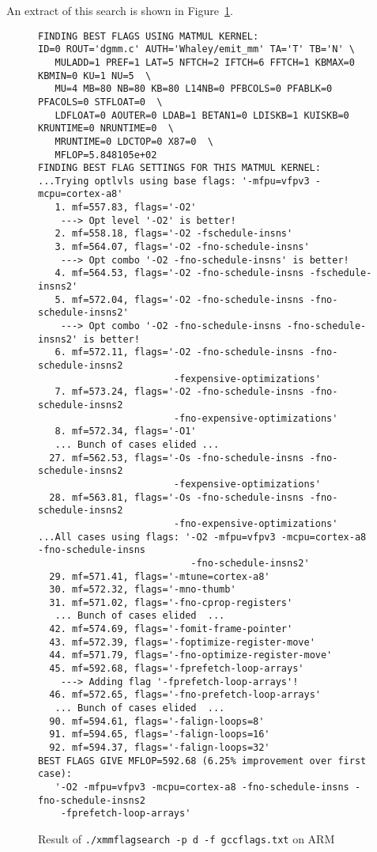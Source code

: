 \documentclass[11pt]{article}
\begin{document}
An extract of this search is shown in Figure~\ref{fig-flagsrch}.

\begin{figure}[p]
\begin{footnotesize}
\begin{verbatim}
FINDING BEST FLAGS USING MATMUL KERNEL:
ID=0 ROUT='dgmm.c' AUTH='Whaley/emit_mm' TA='T' TB='N' \
   MULADD=1 PREF=1 LAT=5 NFTCH=2 IFTCH=6 FFTCH=1 KBMAX=0 KBMIN=0 KU=1 NU=5  \
   MU=4 MB=80 NB=80 KB=80 L14NB=0 PFBCOLS=0 PFABLK=0 PFACOLS=0 STFLOAT=0  \
   LDFLOAT=0 AOUTER=0 LDAB=1 BETAN1=0 LDISKB=1 KUISKB=0 KRUNTIME=0 NRUNTIME=0  \
   MRUNTIME=0 LDCTOP=0 X87=0  \
   MFLOP=5.848105e+02
FINDING BEST FLAG SETTINGS FOR THIS MATMUL KERNEL:
...Trying optlvls using base flags: '-mfpu=vfpv3 -mcpu=cortex-a8'
   1. mf=557.83, flags='-O2'
    ---> Opt level '-O2' is better!
   2. mf=558.18, flags='-O2 -fschedule-insns'
   3. mf=564.07, flags='-O2 -fno-schedule-insns'
    ---> Opt combo '-O2 -fno-schedule-insns' is better!
   4. mf=564.53, flags='-O2 -fno-schedule-insns -fschedule-insns2'
   5. mf=572.04, flags='-O2 -fno-schedule-insns -fno-schedule-insns2'
    ---> Opt combo '-O2 -fno-schedule-insns -fno-schedule-insns2' is better!
   6. mf=572.11, flags='-O2 -fno-schedule-insns -fno-schedule-insns2 
                        -fexpensive-optimizations'
   7. mf=573.24, flags='-O2 -fno-schedule-insns -fno-schedule-insns2 
                        -fno-expensive-optimizations'
   8. mf=572.34, flags='-O1'
   ... Bunch of cases elided ...
  27. mf=562.53, flags='-Os -fno-schedule-insns -fno-schedule-insns2 
                        -fexpensive-optimizations'
  28. mf=563.81, flags='-Os -fno-schedule-insns -fno-schedule-insns2 
                        -fno-expensive-optimizations'
...All cases using flags: '-O2 -mfpu=vfpv3 -mcpu=cortex-a8 -fno-schedule-insns
                           -fno-schedule-insns2'
  29. mf=571.41, flags='-mtune=cortex-a8'
  30. mf=572.32, flags='-mno-thumb'
  31. mf=571.02, flags='-fno-cprop-registers'
   ... Bunch of cases elided  ...
  42. mf=574.69, flags='-fomit-frame-pointer'
  43. mf=572.39, flags='-foptimize-register-move'
  44. mf=571.79, flags='-fno-optimize-register-move'
  45. mf=592.68, flags='-fprefetch-loop-arrays'
    ---> Adding flag '-fprefetch-loop-arrays'!
  46. mf=572.65, flags='-fno-prefetch-loop-arrays'
   ... Bunch of cases elided  ...
  90. mf=594.61, flags='-falign-loops=8'
  91. mf=594.65, flags='-falign-loops=16'
  92. mf=594.37, flags='-falign-loops=32'
BEST FLAGS GIVE MFLOP=592.68 (6.25% improvement over first case):
   '-O2 -mfpu=vfpv3 -mcpu=cortex-a8 -fno-schedule-insns -fno-schedule-insns2 
    -fprefetch-loop-arrays'
\end{verbatim}
\end{footnotesize}
\caption{Result of {\tt ./xmmflagsearch -p d -f gccflags.txt} on ARM}
\label{fig-flagsrch}
\end{figure}
\end{document}
